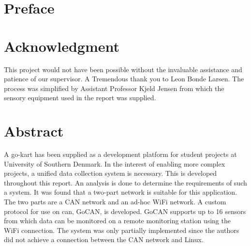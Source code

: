 \section*{Preface}

\section*{Acknowledgment}
This project would not have been possible without the invaluable assistance and patience of our supervisor. 
A Tremendous thank you to Leon Bonde Larsen.
The process was simplified by Assistant Professor Kjeld Jensen from which the sensory equipment used in the report was supplied.

\section*{Abstract}
A go-kart has been supplied as a development platform for student projects at University of Southern Denmark.
In the interest of enabling more complex projects, a unified data collection system is necessary.
This is developed throughout this report. 
An analysis is done to determine the requirements of such a system.
It was found that a two-part network is suitable for this application.
The two parts are a CAN network and an ad-hoc WiFi network.
A custom protocol for use on can, GoCAN, is developed.
GoCAN supports up to 16 sensors from which data can be monitored on a remote monitoring station using the WiFi connection.
The system was only partially implemented since the authors did not achieve a connection between the CAN network and Linux.
